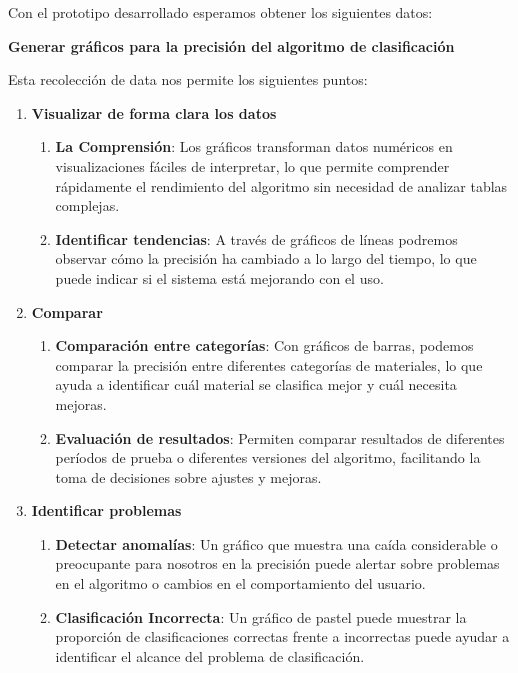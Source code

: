 Con el prototipo desarrollado esperamos obtener los siguientes datos:

\textbf{Generar gráficos para la precisión del algoritmo de clasificación}

Esta recolección de data nos permite los siguientes puntos:

\begin{enumerate}
    \item \textbf{Visualizar de forma clara los datos}
    \begin{enumerate}
        \item \textbf{La Comprensión}: Los gráficos transforman datos numéricos en visualizaciones fáciles de interpretar, lo que permite comprender rápidamente el rendimiento del algoritmo sin necesidad de analizar tablas complejas.
        \item \textbf{Identificar tendencias}: A través de gráficos de líneas podremos observar cómo la precisión ha cambiado a lo largo del tiempo, lo que puede indicar si el sistema está mejorando con el uso.
    \end{enumerate}
    
    \item \textbf{Comparar}
    \begin{enumerate}
        \item \textbf{Comparación entre categorías}: Con gráficos de barras, podemos comparar la precisión entre diferentes categorías de materiales, lo que ayuda a identificar cuál material se clasifica mejor y cuál necesita mejoras.
        \item \textbf{Evaluación de resultados}: Permiten comparar resultados de diferentes períodos de prueba o diferentes versiones del algoritmo, facilitando la toma de decisiones sobre ajustes y mejoras.
    \end{enumerate}

    \item \textbf{Identificar problemas}
    \begin{enumerate}
        \item \textbf{Detectar anomalías}: Un gráfico que muestra una caída considerable o preocupante para nosotros en la precisión puede alertar sobre problemas en el algoritmo o cambios en el comportamiento del usuario.
        \item \textbf{Clasificación Incorrecta}: Un gráfico de pastel puede muestrar la proporción de clasificaciones correctas frente a incorrectas puede ayudar a identificar el alcance del problema de clasificación.
    \end{enumerate}


\end{enumerate}
